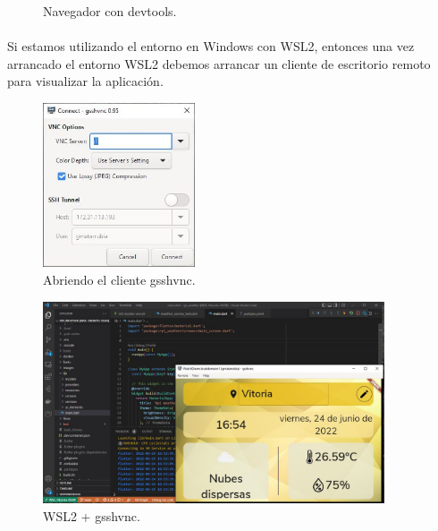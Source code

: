 \begin{figure}[H]
    \centering
    \caption[Navegador con devtools]{Navegador con devtools.}
    \label{imgs:devtools}
\end{figure}

\paragraph{}Si estamos utilizando el entorno en Windows con \gls{WSL2}, entonces una
vez arrancado el entorno \gls{WSL2} debemos arrancar un cliente de escritorio remoto
para visualizar la aplicación.

\begin{figure}[H]
    \centering
    \includegraphics[width=0.40\textwidth]{imgs/gsshvnc-open}
    \caption[Abriendo el cliente gsshvnc]{Abriendo el cliente gsshvnc.}
    \label{imgs:open-gsshvnc}
\end{figure}

\begin{figure}[H]
    \centering
    \includegraphics[width=0.90\textwidth]{imgs/wsl2-running}
    \caption[WSL2 + gsshvnc.c]{WSL2 + gsshvnc.}
    \label{imgs:running-gsshvnc}
\end{figure}

